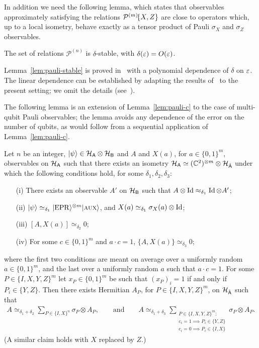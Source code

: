In addition we need the following lemma, which states that observables approximately satisfying the relations $\mathcal{P}^{(m)}\!\{X,Z\}$ are close to operators which, up to a local isometry, behave exactly as a tensor product of Pauli $\sigma_X$ and $\sigma_Z$ observables. 


\begin{lemma}\label{lem:pauli-stable}
The set of relations $\mathcal{P}^{(n)}$ is $\delta$-stable, with $\delta(\varepsilon) = O(\varepsilon)$.
\end{lemma}

Lemma~\ref{lem:pauli-stable} is proved in~\cite{natarajan2016robust} with a polynomial dependence of $\delta$ on $\varepsilon$. The linear dependence can be established by adapting the results of~\cite{gowers2015inverse} to the present setting; we omit the details (see~\cite{ghblog}). 

The following lemma is an extension of Lemma~\ref{lem:pauli-c} to the case of multi-qubit Pauli observables; the lemma avoids any dependence of the error on the number of qubits, as would follow from a sequential application of Lemma~\ref{lem:pauli-c}.

\begin{lemma}\label{lem:pauli-c-n}
Let $n$ be an integer, $|\psi\rangle \in \mathcal{H}_{{\textsf{A}}} \otimes \mathcal{H}_{{\textsf{B}}}$ and $A$ and $X(a)$, for $a\in\{0,1\}^m$, observables on $\mathcal{H}_{{\textsf{A}}}$ such that there exists an isometry $\mathcal{H}_{{\textsf{A}}} \simeq (\mathbb{C}^2)^{\otimes m}\otimes \mathcal{H}_{\hat{{\textsf{A}}}}$ under which the following conditions hold, for some $\delta_1,\delta_2,\delta_3$:
\begin{enumerate}
\item[(i)] There exists an observable $A'$ on $\mathcal{H}_{\textsf{B}}$ such that $A\otimes \mathop{\rm Id}\nolimits \approx_{\delta_1} \mathop{\rm Id}\nolimits \otimes A'$;
\item[(ii)] $|\psi\rangle \simeq_{\delta_1} |{\rm EPR}\rangle^{\otimes m}|\textsc {aux}\rangle$, and $X(a)\simeq_{\delta_1} \sigma_X(a) \otimes \mathop{\rm Id}\nolimits$;
\item[(iii)] $[A,X(a)]\simeq_{\delta_2} 0$;
\item[(iv)] For some $c\in\{0,1\}^m$ and $a\cdot c=1$, $\{A,X(a)\} \simeq_{\delta_3} 0$;
\end{enumerate}
where the first two conditions are meant on average over a uniformly random
  $a\in\{0,1\}^m$, and the last over a uniformly random $a$ such that $a\cdot c
  =1$. For some $P\in\{I,X,Y,Z\}^m$ let $x_P \in\{0,1\}^m$ be such that $(x_P)_i=1$ if and only if $P_i\in\{Y,Z\}$.
Then there exists Hermitian $A_P$, for $P\in\{I,X,Y,Z\}^m$, on $\mathcal{H}_{\hat{{\textsf{A}}}}$ such that 
\begin{align*}
A \simeq_{\delta_1+\delta_2} \sum_{P\in\{I,X\}^n} \sigma_P \otimes A_P,\qquad\text{and}\qquad A \simeq_{\delta_1+\delta_3} \sum_{\substack{P\in\{I,X,Y,Z\}^m:\\ c_i=1 \implies P_i \in \{Y,Z\}\\  c_i=0 \implies P_i \in \{I,X\}}} \sigma_P \otimes A_P.
\end{align*}
 (A similar claim holds with $X$ replaced by $Z$.)
\end{lemma}

